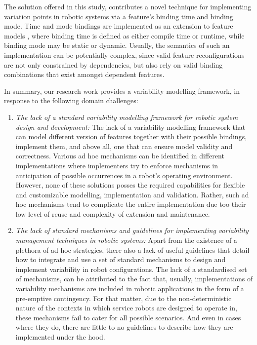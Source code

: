 \documentclass[conference]{IEEEtran}
\begin{document}
The solution offered in this study, contributes a novel technique for implementing variation points in robotic systems via a feature's binding time and binding mode. Time and mode bindings are implemented as an extension to feature models \cite{flex-feat-bind}, where binding time is defined as either compile time or runtime, while binding mode may be static or dynamic. Usually, the semantics of such an implementation can be potentially complex, since valid feature reconfigurations are not only constrained by dependencies, but also rely on valid binding combinations that exist amongst dependent features.

In summary, our research work provides a variability modelling framework, in response to the following domain challenges:
\begin{enumerate}
    \item \textit{The lack of a standard variability modelling framework for robotic system design and development: }The lack of a variability modelling framework that can model different version of features together with their possible bindings, implement them, and above all, one that can ensure model validity and correctness. Various ad hoc mechanisms can be identified in different implementations where implementers try to enforce mechanisms in anticipation of possible occurrences in a robot's operating environment. However, none of these solutions posses the required capabilities for flexible and customizable modelling, implementation and validation. Rather, such ad hoc mechanisms tend to complicate the entire implementation due too their low level of reuse and complexity of extension and maintenance.
    
    \item \textit{The lack of standard mechanisms and guidelines for implementing variability management techniques in robotic systems:} Apart from the existence of a plethora of ad hoc strategies, there also a lack of useful guidelines that detail how to integrate and use a set of standard mechanisms to design and implement variability in robot configurations. The lack of a standardised set of mechanisms, can be attributed to the fact that, usually, implementations of variability mechanisms are included in robotic applications in the form of a pre-emptive contingency. For that matter, due to the non-deterministic nature of the contexts in which service robots are designed to operate in, these mechanisms fail to cater for all possible scenarios. And even in cases where they do, there are little to no guidelines to describe how they are implemented under the hood.
    

\end{enumerate}
\end{document}
